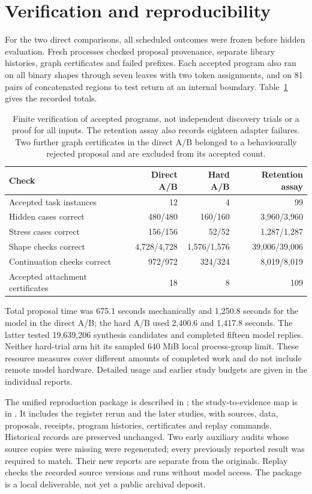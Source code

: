 \section{Verification and reproducibility}
\label{sec:growth-records}

For the two direct comparisons, all scheduled outcomes were frozen before
hidden evaluation. Fresh processes checked proposal provenance, separate
library histories, graph certificates and failed prefixes. Each accepted
program also ran on all binary shapes through seven leaves with two token
assignments, and on 81 pairs of concatenated regions to test return at an
internal boundary. Table~\ref{tab:growth-audit} gives the recorded totals.

\begin{table}[htbp]
\centering
\small
\begin{tabular}{lrrr}
\toprule
Check & Direct A/B & Hard A/B & Retention assay \\
\midrule
Accepted task instances & 12 & 4 & 99 \\
Hidden cases correct & 480/480 & 160/160 & 3,960/3,960 \\
Stress cases correct & 156/156 & 52/52 & 1,287/1,287 \\
Shape checks correct & 4,728/4,728 & 1,576/1,576 & 39,006/39,006 \\
Continuation checks correct & 972/972 & 324/324 & 8,019/8,019 \\
Accepted attachment certificates & 18 & 8 & 109 \\
\bottomrule
\end{tabular}
\caption{Finite verification of accepted programs, not independent discovery
trials or a proof for all inputs. The retention assay also records eighteen
adapter failures. Two further graph certificates in the direct A/B belonged
to a behaviourally rejected proposal and are excluded from its accepted count.}
\label{tab:growth-audit}
\end{table}

Total proposal time was 675.1 seconds mechanically and 1,250.8 seconds for
the model in the direct A/B; the hard A/B used 2,400.6 and 1,417.8 seconds.
The latter tested 19,639,206 synthesis candidates and completed fifteen model
replies. Neither hard-trial arm hit its sampled 640 MiB local process-group
limit. These resource measures cover different amounts of completed work and
do not include remote model hardware. Detailed usage and earlier study budgets
are given in the individual reports.

The unified reproduction package is described in
; the study-to-evidence map is in
. It includes the register rerun and
the later studies, with sources, data, proposals, receipts, program histories,
certificates and replay commands. Historical records are preserved unchanged.
Two early auxiliary audits whose source copies were missing were regenerated;
every previously reported result was required to match. Their new reports are
separate from the originals. Replay checks the recorded source versions and
runs without model access. The package is a local deliverable, not yet a public
archival deposit.

